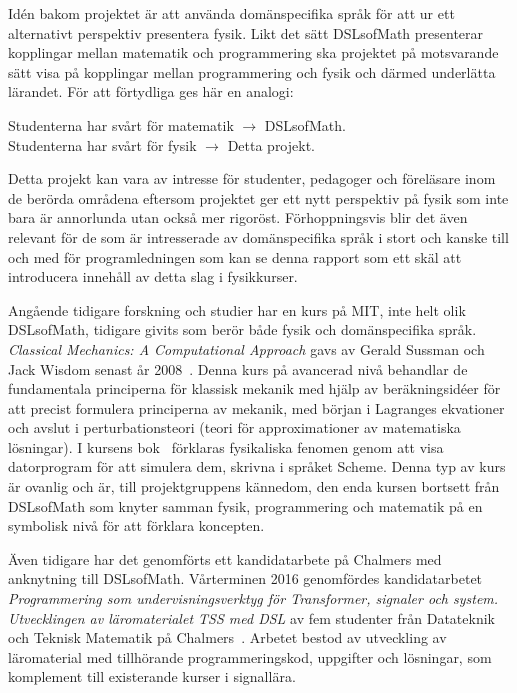 Idén bakom projektet är att använda domänspecifika språk för att ur ett alternativt perspektiv presentera fysik. Likt det sätt DSLsofMath
presenterar kopplingar mellan matematik och programmering ska projektet på motsvarande sätt visa på kopplingar mellan programmering och fysik och därmed
underlätta lärandet. För att förtydliga ges här en analogi:


\begin{center}
Studenterna har svårt för matematik $\rightarrow $ DSLsofMath.\\
Studenterna har svårt för fysik $\rightarrow $ Detta projekt.
\end{center}

Detta projekt kan vara av intresse för studenter, pedagoger och
föreläsare inom de berörda områdena eftersom projektet ger ett nytt
perspektiv på fysik som inte bara är annorlunda utan också mer rigoröst.
Förhoppningsvis blir det även relevant för de som är intresserade av
domänspecifika språk i stort och kanske till och med för programledningen som
kan se denna rapport som ett skäl att introducera innehåll av detta slag i
fysikkurser.

Angående tidigare forskning och studier har en kurs på MIT, inte helt olik
DSLsofMath, tidigare givits som berör både fysik och
domänspecifika språk.
\textit{Classical Mechanics: A Computational Approach} gavs av Gerald Sussman
och Jack Wisdom senast år 2008~\cite{classical-mechanics-course-mit-2008}.
Denna kurs på avancerad nivå behandlar de fundamentala principerna för klassisk
mekanik med hjälp av beräkningsidéer för att precist formulera principerna av
mekanik, med början i Lagranges ekvationer och avslut i perturbationsteori
(teori för approximationer av matematiska lösningar). I kursens bok~\cite{SICM}
förklaras fysikaliska fenomen genom att visa datorprogram för att simulera dem,
skrivna i språket Scheme. Denna typ av kurs är ovanlig och är, till
projektgruppens kännedom, den enda kursen bortsett från DSLsofMath som knyter
samman fysik, programmering och matematik på en symbolisk nivå för att förklara
koncepten.

Även tidigare har det genomförts ett kandidatarbete på Chalmers med anknytning till DSLsofMath.
Vårterminen 2016 genomfördes kandidatarbetet \textit{Programmering som
undervisningsverktyg för Transformer, signaler och system. Utvecklingen av
läromaterialet TSS med DSL} av fem studenter från Datateknik och Teknisk
Matematik på Chalmers~\cite{kandidat2016}. Arbetet bestod av utveckling av läromaterial med
tillhörande programmeringskod, uppgifter och lösningar, som komplement till
existerande kurser i signallära.

